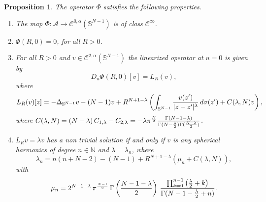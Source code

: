 \documentclass[10pt,reqno,english]{amsart}
\newcommand{\Sn}{\mathbb{S}^{N-1}}
\newcommand{\N}{\mathbb{N}}
\newtheorem{prop}[lemma]{Proposition}
\theoremstyle{definition}
\numberwithin{equation}{section}
\begin{document}
\begin{prop}
The operator $\Phi$ satisfies the following properties.
\begin{enumerate}
\item The map $\Phi:\mathcal A\to\mathcal C^{0,\alpha}(\Sn)$ is of class $\mathcal C^\infty$.
\item $\Phi(R,0)=0$, for all $R>0$.
\item For all $R>0$ and $v\in\mathcal C^{2,\alpha}(\Sn)$ the linearized operator at $u=0$ is given by
\[
D_u\Phi(R,0)[v]=L_R(v),
\]
where
\[
L_R(v)[z]= -\Delta_{\mathbb S^{N-1}} v - (N-1) v +R^{N+1-\lambda} \left( \int_{\mathbb S^{N-1}} {v (z') \over |z-z'|^\lambda }\,d\sigma(z') + C (\lambda, N) v\right),
\]
where $C (\lambda, N)= (N-\lambda ) \, C_{1,\lambda} - C_{2,\lambda }=-\lambda\pi^{\frac N2}\frac{\Gamma(N-1-\lambda)}{ \Gamma (N -{\lambda \over 2})\Gamma(\frac{N-\lambda}{2})}$.
\item $L_R v=\lambda v$ has a non trivial solution if and only if $v$ is any spherical harmonics of degree $n\in\N$ and $\lambda=\lambda_n$, where
\[
\lambda_n=n (n +N-2) - (N-1) +R^{N+1-\lambda}( \mu_n + C (\lambda, N) ),
\]
with
\[
\mu_n = 2^{N-1-\lambda} \, \pi^{N-1 \over 2}\,\Gamma \left({N-1-\lambda \over 2}\right)\,\frac{\prod_{k=0}^{n-1}\left(\frac\lambda2+k\right)} {\Gamma (N-1 -{\lambda \over 2} + n)}.
\]
\end{enumerate}
\end{prop}
\end{document}
